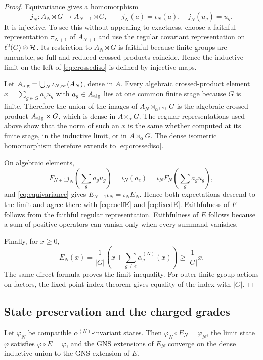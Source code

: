 \begin{proof}
Equivariance gives a homomorphism
\[
 j_N:A_N\rtimes G\longrightarrow A_{N+1}\rtimes G,\qquad
 j_N(a)=\iota_N(a),\quad j_N(u_g)=u_g.
\tag{6.6}\label{eq:crossmap}
\]
It is injective.  To see this without appealing to exactness, choose a
faithful representation $\pi_{N+1}$ of $A_{N+1}$ and use the regular
covariant representation on $\ell^2(G)\otimes\mathcal H$.  Its restriction to
$A_N\rtimes G$ is faithful because finite groups are amenable, so full
and reduced crossed products coincide.  Hence the inductive limit on the
left of \eqref{eq:crossediso} is defined by injective maps.

Let $A_{\rm alg}=\bigcup_N\iota_{N,\infty}(A_N)$, dense in $A$.
Every algebraic crossed-product element
$x=\sum_{g\in G}a_gu_g$ with $a_g\in A_{\rm alg}$ lies at one common
finite stage because $G$ is finite.  Therefore the union of the images
of $A_N\rtimes_{\alpha^{(N)}}G$ is the algebraic crossed product
$A_{\rm alg}\rtimes G$, which is dense in $A\rtimes_\alpha G$.
The regular representations used above show that the norm of such an
$x$ is the same whether computed at its finite stage, in the inductive
limit, or in $A\rtimes_\alpha G$.  The dense isometric homomorphism
therefore extends to \eqref{eq:crossediso}.

On algebraic elements,
\[
 F_{N+1}j_N\!\left(\sum_ga_gu_g\right)
 =\iota_N(a_e)=\iota_NF_N\!\left(\sum_ga_gu_g\right),
\]
and \eqref{eq:equivariance} gives
$E_{N+1}\iota_N=\iota_NE_N$.  Hence both expectations descend to the
limit and agree there with \eqref{eq:coeffE} and
\eqref{eq:fixedE}.  Faithfulness of $F$ follows from the faithful regular
representation.  Faithfulness of $E$ follows because a sum of positive
operators can vanish only when every summand vanishes.

Finally, for $x\ge0$,
\[
 E_N(x)=\frac1{|G|}
 \left(x+\sum_{g\ne e}\alpha_g^{(N)}(x)\right)
 \ge\frac1{|G|}x.
\]
The same direct formula proves the limit inequality.  For outer finite
group actions on factors, the fixed-point index theorem gives equality
of the index with $|G|$.
\end{proof}

\subsection{State preservation and the charged grades}

\begin{corollary}
\label{cor:stateE}
Let $\varphi_N$ be compatible $\alpha^{(N)}$-invariant states.  Then
$\varphi_N\circ E_N=\varphi_N$, the limit state $\varphi$ satisfies
$\varphi\circ E=\varphi$, and the GNS extensions of $E_N$ converge on
the dense inductive union to the GNS extension of $E$.
\end{corollary}

